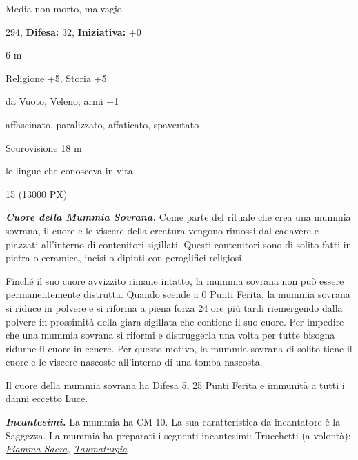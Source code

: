 \begin{multicols}{2}
{
\noindent
\begin{description}[noitemsep, topsep=0pt, parsep=0pt, partopsep=0pt, leftmargin=0cm, labelwidth=2.2cm]
	\item[\textbf{Taglia/Tipo:}] Media non morto, malvagio
	\item[\textbf{Caratt.:}] 
	\item[\textbf{Punti Ferita:}] 294,  \textbf{Difesa:} 32,  \textbf{Iniziativa:} +0
	\item[\textbf{Movimento:}] 6 m
	\item[\textbf{Tiri Salvez.:}] 
	\item[\textbf{Comp.:}] Religione +5, Storia +5
	\item[\textbf{Imm. Danni:}] da Vuoto, Veleno; armi +1
	\item[\textbf{Immunità:}] affascinato, paralizzato, affaticato, spaventato
	\item[\textbf{Sensi:}] Scurovisione 18 m
	\item[\textbf{Linguaggi:}] le lingue che conosceva in vita
	\item[\textbf{Sfida:}] 15 (13000 PX)\smallskip
\end{description}

\emph{\textbf{Cuore della Mummia Sovrana.}} Come parte del rituale che crea una mummia sovrana, il cuore e le viscere della creatura vengono rimossi dal cadavere e piazzati all'interno di contenitori sigillati. Questi contenitori sono di solito fatti in pietra o ceramica, incisi o dipinti con geroglifici religiosi.

Finché il suo cuore avvizzito rimane intatto, la mummia sovrana non può essere permanentemente distrutta. Quando scende a 0 Punti Ferita, la mummia sovrana si riduce in polvere e si riforma a piena forza 24 ore più tardi riemergendo dalla polvere in prossimità della giara sigillata che contiene il suo cuore. Per impedire che una mummia sovrana si riformi e distruggerla una volta per tutte bisogna ridurne il cuore in cenere. Per questo motivo, la mummia sovrana di solito tiene il cuore e le viscere nascoste all'interno di una tomba nascosta.

Il cuore della mummia sovrana ha Difesa 5, 25 Punti Ferita e immunità a tutti i danni eccetto Luce.

\emph{\textbf{Incantesimi.}} La mummia ha CM 10. La sua caratteristica da incantatore è la Saggezza. La mummia ha preparati i seguenti incantesimi: Trucchetti (a volontà): \emph{\hyperlink{Fiamma Sacra}{Fiamma Sacra}, \hyperlink{Taumaturgia}{Taumaturgia}}

}
\end{multicols}
